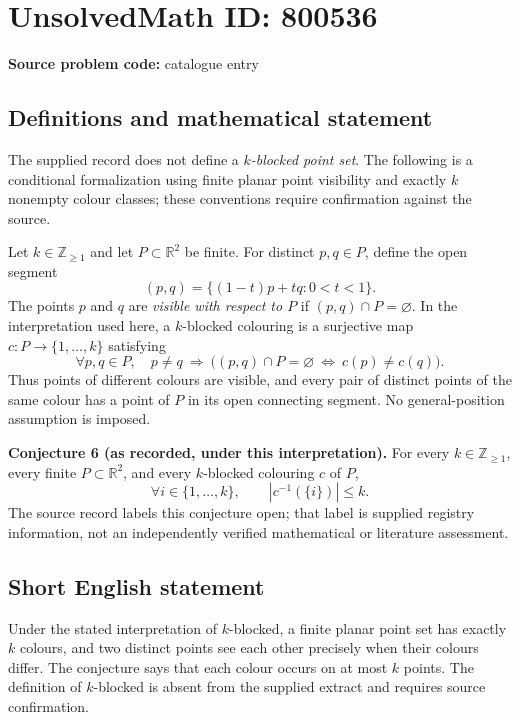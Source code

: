 \documentclass[11pt]{article}
\newcommand{\Z}{\mathbb{Z}}
\newcommand{\R}{\mathbb{R}}
\begin{document}
\section*{UnsolvedMath ID: 800536}
\textbf{Source problem code:} catalogue entry
\subsection{Definitions and mathematical statement}
The supplied record does not define a \emph{$k$-blocked point set}. The following is a conditional formalization using finite planar point visibility and exactly $k$ nonempty colour classes; these conventions require confirmation against the source.

Let $k\in\Z_{\geq 1}$ and let $P\subset\R^2$ be finite. For distinct $p,q\in P$, define the open segment
\[
(p,q)=\{(1-t)p+tq:0<t<1\}.
\]
The points $p$ and $q$ are \emph{visible with respect to $P$} if $(p,q)\cap P=\varnothing$. In the interpretation used here, a $k$-blocked colouring is a surjective map $c:P\to\{1,\ldots,k\}$ satisfying
\[
\forall p,q\in P,\quad p\ne q\ \Longrightarrow\ \bigl((p,q)\cap P=\varnothing\ \Longleftrightarrow\ c(p)\ne c(q)\bigr).
\]
Thus points of different colours are visible, and every pair of distinct points of the same colour has a point of $P$ in its open connecting segment. No general-position assumption is imposed.

\textbf{Conjecture 6 (as recorded, under this interpretation).} For every $k\in\Z_{\geq 1}$, every finite $P\subset\R^2$, and every $k$-blocked colouring $c$ of $P$,
\[
\forall i\in\{1,\ldots,k\},\qquad |c^{-1}(\{i\})|\leq k.
\]
The source record labels this conjecture open; that label is supplied registry information, not an independently verified mathematical or literature assessment.
\subsection{Short English statement}
Under the stated interpretation of $k$-blocked, a finite planar point set has exactly $k$ colours, and two distinct points see each other precisely when their colours differ. The conjecture says that each colour occurs on at most $k$ points. The definition of $k$-blocked is absent from the supplied extract and requires source confirmation.
\end{document}
